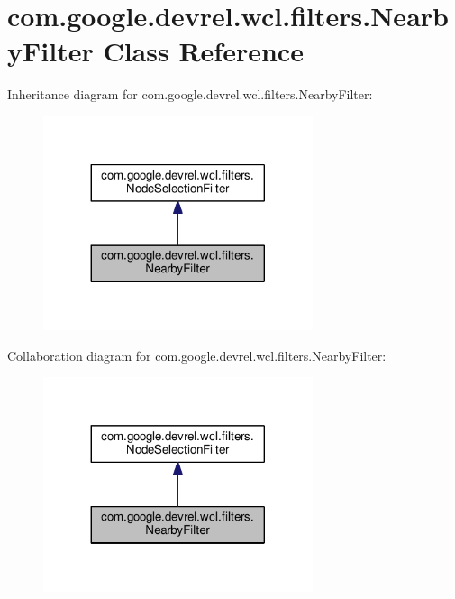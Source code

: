 \hypertarget{classcom_1_1google_1_1devrel_1_1wcl_1_1filters_1_1NearbyFilter}{}\section{com.\+google.\+devrel.\+wcl.\+filters.\+Nearby\+Filter Class Reference}
\label{classcom_1_1google_1_1devrel_1_1wcl_1_1filters_1_1NearbyFilter}


Inheritance diagram for com.\+google.\+devrel.\+wcl.\+filters.\+Nearby\+Filter\+:
\nopagebreak
\begin{figure}[H]
\begin{center}
\leavevmode
\includegraphics[width=224pt]{d1/d6d/classcom_1_1google_1_1devrel_1_1wcl_1_1filters_1_1NearbyFilter__inherit__graph}
\end{center}
\end{figure}


Collaboration diagram for com.\+google.\+devrel.\+wcl.\+filters.\+Nearby\+Filter\+:
\nopagebreak
\begin{figure}[H]
\begin{center}
\leavevmode
\includegraphics[width=224pt]{d4/d03/classcom_1_1google_1_1devrel_1_1wcl_1_1filters_1_1NearbyFilter__coll__graph}
\end{center}
\end{figure}

